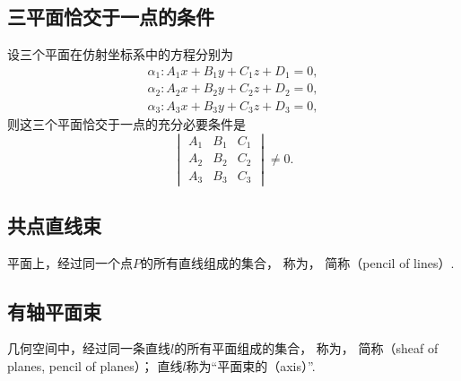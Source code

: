\subsection{三平面恰交于一点的条件}
\begin{theorem}
设三个平面在仿射坐标系中的方程分别为\begin{equation*}
	\begin{split}
		\alpha_1: A_1 x + B_1 y + C_1 z + D_1 = 0, \\
		\alpha_2: A_2 x + B_2 y + C_2 z + D_2 = 0, \\
		\alpha_3: A_3 x + B_3 y + C_3 z + D_3 = 0,
	\end{split}
\end{equation*}
则这三个平面恰交于一点的充分必要条件是\begin{equation*}
	\begin{vmatrix}
		A_1 & B_1 & C_1 \\
		A_2 & B_2 & C_2 \\
		A_3 & B_3 & C_3
	\end{vmatrix}
	\neq 0.
\end{equation*}
\end{theorem}

\subsection{共点直线束}
平面上，经过同一个点\(P\)的所有直线组成的集合，
称为，
简称（pencil of lines）.

\subsection{有轴平面束}
几何空间中，经过同一条直线\(l\)的所有平面组成的集合，
称为，
简称（sheaf of planes, pencil of planes）；
直线\(l\)称为“平面束的（axis）”.

